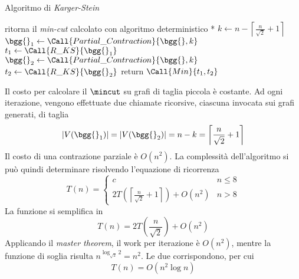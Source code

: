 \begin{algorithm}[H]
\caption{Algoritmo di \emph{Karger-Stein}}\label{alg:karger_stein}
\begin{algorithmic}[1]
            \State * ritorna il \emph{min-cut} calcolato con algoritmo deterministico *
        \EndIf
        \State $k \gets 
        n -
        \left\lceil 
            \frac{n}{\sqrt{2}} + 1
        \right\rceil
        $ 
        \State $\bgg{}_{1} \gets \Call{Partial\_Contraction}{\bgg{}, k} $
        \State $t_{1} \gets \Call{R\_KS}{\bgg{}_{1}} $
        \State $\bgg{}_{2} \gets \Call{Partial\_Contraction}{\bgg{}, k} $
        \State $t_{2} \gets \Call{R\_KS}{\bgg{}_{2}} $
        \State return $\Call{Min}{t_1, t_2} $
    \EndProcedure
\end{algorithmic}
\end{algorithm}
\noindent
Il costo per calcolare il $
\mincut
$ su grafi di taglia piccola è costante.
Ad ogni iterazione,
vengono effettuate due chiamate ricorsive, ciascuna invocata sui grafi generati, di taglia
\begin{equation*}
    |
    V(\bgg{}_{1})
    | = |
    V(\bgg{}_{2})
    | = 
    n - k = 
    \left\lceil 
        \frac{n}{\sqrt{2}} + 1
    \right\rceil
\end{equation*}
Il costo di una contrazione parziale è $
O \left( n^2 \right)
$.
La complessità dell'algoritmo si può quindi determinare
risolvendo l'equazione di ricorrenza
\begin{equation*}
    T(n) =
    \begin{cases}
        c & n \leq 8
        \\
        2
        T\left( 
            \left\lceil 
                \frac{n}{\sqrt{2}} + 1
            \right\rceil
        \right)
        +
        O \left( n^2 \right)
        &
        n > 8
    \end{cases}
\end{equation*}
La funzione si semplifica in 
\begin{equation*}
    T(n) =
    2
    T\left( 
        \frac{n}{\sqrt{2}}
    \right)
    +
    O \left( n^2 \right)
\end{equation*}
Applicando il \emph{master theorem}, il work per iterazione è $
O \left( n^2 \right)
$, mentre la funzione di soglia risulta $
n^{\log_{\sqrt{2}} 2} = n^2
$. Le due corrispondono, per cui 
\begin{equation*}
    T(n) = O \left( n^2 \log n \right)
\end{equation*}

